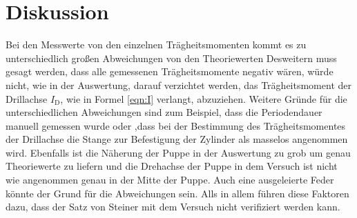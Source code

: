 \section{Diskussion}
\label{sec:Diskussion}
Bei den Messwerte von den einzelnen Trägheitsmomenten kommt es zu unterschiedlich großen Abweichungen von den Theoriewerten
Desweitern muss gesagt werden, dass alle gemessenen Trägheitsmomente negativ wären, würde nicht, wie in der Auswertung,
darauf verzichtet werden, das Trägheitsmoment der Drillachse $I_\mathrm{D}$, wie in Formel \eqref{eqn:I} verlangt, abzuziehen.
Weitere Gründe für die unterschiedlichen Abweichungen sind zum Beispiel, dass die
Periodendauer manuell gemessen wurde oder ,dass bei der Bestimmung
des Trägheitsmomentes der Drillachse die Stange zur Befestigung der
Zylinder als masselos angenommen wird. Ebenfalls ist die Näherung der Puppe in der Auswertung zu grob um genau Theoriewerte zu liefern und
die Drehachse der Puppe in dem Versuch ist nicht wie angenommen genau in der Mitte der Puppe.
Auch eine ausgeleierte Feder könnte der Grund für die Abweichungen sein.
Alls in allem führen diese Faktoren dazu, dass der Satz von Steiner mit dem Versuch nicht verifiziert werden kann.
